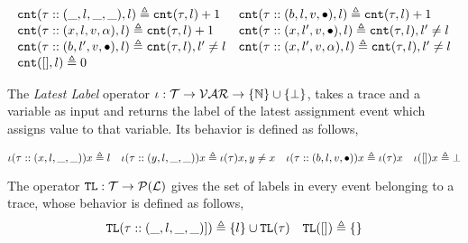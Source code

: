   \begin{defn}
    \label{def:trace_cnt}
    \[
      \begin{array}{ll}
      \mathtt{cnt}(\mathtt{\tau} :: (\_, l, \_, \_), l ) \triangleq \mathtt{cnt}(\mathtt{\tau}, l) + 1
      &
      \mathtt{cnt}(\mathtt{\tau}  ::(b, l, v, \bullet), l) \triangleq \mathtt{cnt}(\mathtt{\tau}, l) + 1
      \\
      \mathtt{cnt}(\mathtt{\tau}  :: (x, l, v, \alpha), l) \triangleq \mathtt{cnt}(\mathtt{\tau}, l) + 1
      &
      \mathtt{cnt}(\mathtt{\tau}  :: (x, l', v, \bullet), l) \triangleq \mathtt{cnt}(\mathtt{\tau}, l), l' \neq l
      \\
      \mathtt{cnt}(\mathtt{\tau}  :: (b, l', v, \bullet), l) \triangleq \mathtt{cnt}(\mathtt{\tau}, l), l' \neq l
      &
      \mathtt{cnt}(\mathtt{\tau}  :: (x, l', v, \alpha), l) \triangleq \mathtt{cnt}(\mathtt{\tau}, l), l' \neq l
      \\
      \mathtt{cnt}({[]}, l) \triangleq 0
      \end{array}
      \]
\end{defn}
The \emph{Latest Label}
operator $\iota : \mathcal{T} \to \mathcal{VAR} \to \{\mathbb{N}\}\cup \{\bot\}$,
takes a trace and a variable as input and returns the label of the latest assignment event which assigns value to that variable. 
  Its behavior is defined as follows,
  \begin{defn}
    \[
    \iota(\mathtt{\tau}  :: (x, l, \_, \_)) x \triangleq l
    ~~~
    \iota(\mathtt{\tau}  :: (y, l, \_, \_)) x \triangleq \iota(\mathtt{\tau} ) x, y \neq x
    ~~~
    \iota(\mathtt{\tau} :: (b, l, v, \bullet)) x \triangleq \iota(\mathtt{\tau}) x
    ~~~
    \iota({[]}) x \triangleq \bot
    \]
  \end{defn}
    The operator $\mathtt{TL} : \mathcal{T} \to \mathcal{P}{(\mathcal{L})}$ gives the set of labels in every event belonging to 
    a trace, whose behavior is defined as follows,
  \[
  \mathtt{TL}{(\mathtt{\tau}  :: (\_, l, \_, \_)])} \triangleq \{l\} \cup \mathtt{TL}{(\mathtt{\tau} )}
  ~~~
  \mathtt{TL}({[ ]}) \triangleq \{\}
  \]
%  
